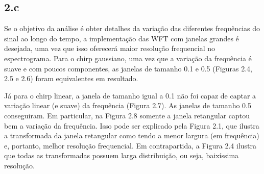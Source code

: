 \begin{figure}[ht!]
	\vspace{3mm}	
	\begin{center}
	\end{center}
	\vspace{1mm}
	\label{ex1_fig1}
\end{figure}


\subsection*{2.c} 
%

Se o objetivo da análise é obter detalhes da variação das diferentes frequências do sinal ao longo do tempo, a implementação das WFT com janelas grandes é desejada, uma vez que isso oferecerá maior resolução frequencial no espectrograma. Para o chirp gaussiano, uma vez que a variação da frequência é suave e com poucos componentes, as janelas de tamanho 0.1 e 0.5 (Figuras 2.4, 2.5 e 2.6) foram equivalentes em resultado. 

Já para o chirp linear, a janela de tamanho igual a 0.1 não foi capaz de captar a variação linear (e suave) da frequência (Figura 2.7). As janelas de tamanho 0.5 conseguiram. Em particular, na Figura 2.8 somente a janela retangular captou bem a variação da frequência. Isso pode ser explicado pela Figura 2.1, que ilustra a transformada da janela retangular como tendo a menor largura (em frequência) e, portanto, melhor resolução frequencial. Em contrapartida, a Figura 2.4 ilustra que todas as transformadas possuem larga distribuição, ou seja, baixíssima resolução.


